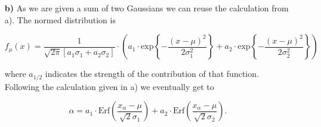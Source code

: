 \documentclass[10pt]{article}
\newenvironment{myfont}{\fontfamily{put}\selectfont}{\par}
\begin{document}
\begin{myfont}
\begin{itemize}
  \begin{align}
    \alpha & = 2 \cdot \int\limits_{\mu}^{x_{\alpha}} \textrm{d}x \cdot \frac{1}{\sqrt{2\pi}\sigma} \textrm{exp}\left\{-\frac{(x - \mu)^{2}}{2\sigma^{2}}\right\} \nonumber\\
     & = 2 \frac{1}{\sqrt{2\pi}\sigma} \cdot \sqrt{\frac{\pi}{2}} \sigma \cdot \textrm{Erf}\left(\frac{x_{\alpha} - \mu}{\sqrt{2}\sigma}\right) \nonumber\\
     & = \textrm{Erf}\left(\frac{x_{\alpha} - \mu}{\sqrt{2}\sigma}\right) \nonumber\\
     \rightarrow x_{\alpha} &= \mu + \sqrt{2}\sigma \cdot \textrm{Erf}^{-1}\left(\alpha\right)
  \end{align}

  \noindent Here $\textrm{Erf}^{-1}$ denotes the inverse error function.

  \begin{adjustwidth}{1.5cm}{1.5cm}
    \noindent For $\alpha =$ \num{0.680}: $x_{\alpha} \in [\num{140.055}, \num{159.945}]$. \\
    \noindent For $\alpha =$ \num{0.950}: $x_{\alpha} \in [\num{130.400}, \num{169.599}]$. \\
    \noindent For $\alpha =$ \num{0.997}: $x_{\alpha} \in [\num{120.322}, \num{179.677}]$. \\
  \end{adjustwidth}

  \item[\textbf{b)}] As we are given a sum of two Gaussians we can reuse the calculation from a).
  The normed distribution is

  \begin{equation}
    f_{\mu}(x) = \frac{1}{\sqrt{2\pi}\left[a_{1}\sigma_{1} + a_{2}\sigma_{2}\right]} \cdot \left(a_{1} \cdot \textrm{exp}\left\{-\frac{(x - \mu)^{2}}{2\sigma_{1}^{2}}\right\} + a_{2} \cdot \textrm{exp}\left\{-\frac{(x - \mu)^{2}}{2\sigma_{2}^{2}}\right\}\right)
  \end{equation}

  \noindent where $a_{1/2}$ indicates the strength of the contribution of that function.
  Following the calculation given in a) we eventually get to

  \begin{equation}
    \alpha = a_{1} \cdot \textrm{Erf}\left(\frac{x_{\alpha} - \mu}{\sqrt{2}\sigma_{1}}\right) + a_{2} \cdot \textrm{Erf}\left(\frac{x_{\alpha} - \mu}{\sqrt{2}\sigma_{2}}\right).
  \end{equation}


\end{itemize}
\end{myfont}
\end{document}

